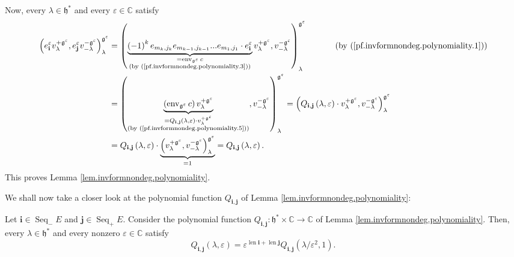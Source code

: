 \documentclass[etingof-lie.tex]{subfiles}
\begin{document}
Now, every $\lambda\in\mathfrak{h}^{\ast}$ and every $\varepsilon\in
\mathbb{C}$ satisfy%
\begin{align*}
\left(  e_{\mathbf{i}}^{\varepsilon}v_{\lambda}^{+\mathfrak{g}^{\varepsilon}%
},e_{\mathbf{j}}^{\varepsilon}v_{-\lambda}^{-\mathfrak{g}^{\varepsilon}%
}\right)  _{\lambda}^{\mathfrak{g}^{\varepsilon}}  &  =\left(
\underbrace{\left(  -1\right)  ^{k}e_{m_{k},j_{k}}e_{m_{k-1},j_{k-1}%
}...e_{m_{1},j_{1}}\cdot e_{\mathbf{i}}^{\varepsilon}}%
_{\substack{=\operatorname*{env}\nolimits_{\mathfrak{g}^{\varepsilon}%
}c\\\text{(by (\ref{pf.invformnondeg.polynomiality.3}))}}}v_{\lambda
}^{+\mathfrak{g}^{\varepsilon}},v_{-\lambda}^{-\mathfrak{g}^{\varepsilon}%
}\right)  _{\lambda}^{\mathfrak{g}^{\varepsilon}}\ \ \ \ \ \ \ \ \ \ \left(
\text{by (\ref{pf.invformnondeg.polynomiality.1})}\right) \\
&  =\left(  \underbrace{\left(  \operatorname*{env}\nolimits_{\mathfrak{g}%
^{\varepsilon}}c\right)  v_{\lambda}^{+\mathfrak{g}^{\varepsilon}}%
}_{\substack{=Q_{\mathbf{i},\mathbf{j}}\left(  \lambda,\varepsilon\right)
\cdot v_{\lambda}^{+\mathfrak{g}^{\varepsilon}}\\\text{(by
(\ref{pf.invformnondeg.polynomiality.5}))}}},v_{-\lambda}^{-\mathfrak{g}%
^{\varepsilon}}\right)  _{\lambda}^{\mathfrak{g}^{\varepsilon}}=\left(
Q_{\mathbf{i},\mathbf{j}}\left(  \lambda,\varepsilon\right)  \cdot v_{\lambda
}^{+\mathfrak{g}^{\varepsilon}},v_{-\lambda}^{-\mathfrak{g}^{\varepsilon}%
}\right)  _{\lambda}^{\mathfrak{g}^{\varepsilon}}\\
&  =Q_{\mathbf{i},\mathbf{j}}\left(  \lambda,\varepsilon\right)
\cdot\underbrace{\left(  v_{\lambda}^{+\mathfrak{g}^{\varepsilon}}%
,v_{-\lambda}^{-\mathfrak{g}^{\varepsilon}}\right)  _{\lambda}^{\mathfrak{g}%
^{\varepsilon}}}_{=1}=Q_{\mathbf{i},\mathbf{j}}\left(  \lambda,\varepsilon
\right)  .
\end{align*}
This proves Lemma \ref{lem.invformnondeg.polynomiality}.

We shall now take a closer look at the polynomial function $Q_{\mathbf{i}%
,\mathbf{j}}$ of Lemma \ref{lem.invformnondeg.polynomiality}:

\begin{lemma}
\label{lem.invformnondeg.polynomiality3}Let $\mathbf{i}\in\operatorname*{Seq}%
\nolimits_{-}E$ and $\mathbf{j}\in\operatorname*{Seq}\nolimits_{+}E$. Consider
the polynomial function $Q_{\mathbf{i},\mathbf{j}}:\mathfrak{h}^{\ast}%
\times\mathbb{C}\rightarrow\mathbb{C}$ of Lemma
\ref{lem.invformnondeg.polynomiality}. Then, every $\lambda\in\mathfrak{h}%
^{\ast}$ and every nonzero $\varepsilon\in\mathbb{C}$ satisfy%
\[
Q_{\mathbf{i},\mathbf{j}}\left(  \lambda,\varepsilon\right)  =\varepsilon
^{\operatorname*{len}\mathbf{i}+\operatorname*{len}\mathbf{j}}Q_{\mathbf{i}%
,\mathbf{j}}\left(  \lambda/\varepsilon^{2},1\right)  .
\]

\end{lemma}
\end{document}
